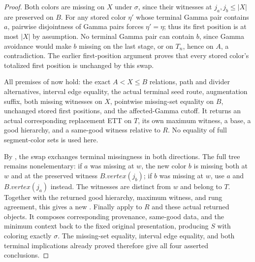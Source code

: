 \begin{proof}
Both colors are missing on \(X\) under \(\sigma\), since their witnesses
at \(j_a,j_b\leq |X|\) are preserved on \(B\).
For any stored color \(\eta'\) whose terminal Gamma pair contains \(a\),
pairwise disjointness of Gamma pairs forces \(\eta'=\eta\); thus its
first position is at most \(|X|\) by assumption. No terminal Gamma pair
can contain \(b\), since Gamma avoidance would make \(b\) missing on
the last stage, or on \(T_n\), hence on \(A\), a contradiction.
The earlier first-position argument proves that every stored color's
totalized first position is unchanged by this swap.

All premises of  now hold:
the exact \(A<X\leq B\) relations, path and divider alternatives,
interval edge equality, the actual terminal seed route, augmentation
suffix, both missing witnesses on \(X\), pointwise missing-set equality
on \(B\), unchanged stored first positions, and the affected-Gamma cutoff.
It returns an actual corresponding replacement ETT on \(T\), its own
maximum witness, a base, a good hierarchy, and a same-good witness
relative to \(R\). No equality of full segment-color sets is used here.

By , the swap exchanges
terminal missingness in both directions. The full tree remains
nonelementary: if \(a\) was missing at \(w\), the new color \(b\) is
missing both at \(w\) and at the preserved witness \(B.vertex(j_b)\);
if \(b\) was missing at \(w\), use \(a\) and \(B.vertex(j_a)\) instead.
The witnesses are distinct from \(w\) and belong to \(T\).
Together with the returned good hierarchy, maximum witness, and rung
agreement, this gives a new .
Finally apply  to \(R\)
and these actual returned objects. It composes corresponding provenance,
same-good data, and the minimum context back to the fixed original
presentation, producing \(S\) with coloring exactly \(\sigma\).
The missing-set equality, interval edge equality, and both terminal
implications already proved therefore give all four asserted conclusions.
\end{proof}
